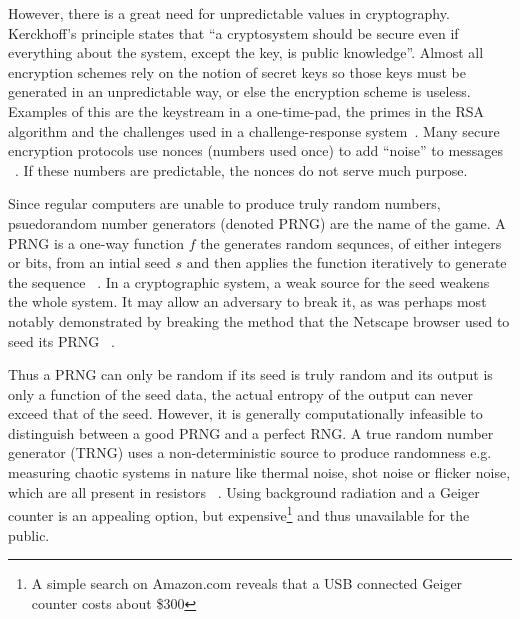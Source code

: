 \documentclass[a4paper]{article}           %
\begin{document}
However, there is a great need for unpredictable values in cryptography. Kerckhoff's principle states that ``a cryptosystem should be secure even if everything about the system, except the key, is public knowledge''. Almost all encryption schemes rely on the notion of secret keys so those keys must be generated in an unpredictable way, or else the encryption scheme is useless. Examples of this are the keystream in a one-time-pad, the primes in the RSA algorithm and the challenges used in a challenge-response system~\cite{menezes1996,anthes2011}. Many secure encryption protocols use nonces (numbers used once) to add ``noise'' to messages ~\cite{anthes2011}. If these numbers are predictable, the nonces do not serve much purpose. 



Since regular computers are unable to produce truly random numbers, psuedorandom number generators (denoted PRNG) are the name of the game. A PRNG is a one-way function $f$ the generates random sequnces, of either integers or bits, from an intial seed $s$ and then applies the function iteratively to generate the sequence ~\cite{menezes1996}. In a cryptographic system, a weak source for the seed weakens the whole system. It may allow an adversary to break it, as was perhaps most notably demonstrated by breaking the method that the Netscape browser used to seed its PRNG ~\cite{netscape}. 

Thus a PRNG can only be random if its seed is truly random and its output is only a function of the seed data, the actual entropy of the output can never exceed that of the seed. However, it is generally computationally infeasible to distinguish between a good PRNG and a perfect RNG. A true random number generator (TRNG) uses a non-deterministic source to produce randomness e.g. measuring chaotic systems in nature like thermal noise, shot noise or flicker noise, which are all present in resistors ~\cite{intel}. Using background radiation and a Geiger counter is an appealing option, but expensive\footnote{A simple search on Amazon.com reveals that a USB connected Geiger counter costs about \$300} and thus unavailable for the public. 
\end{document}
